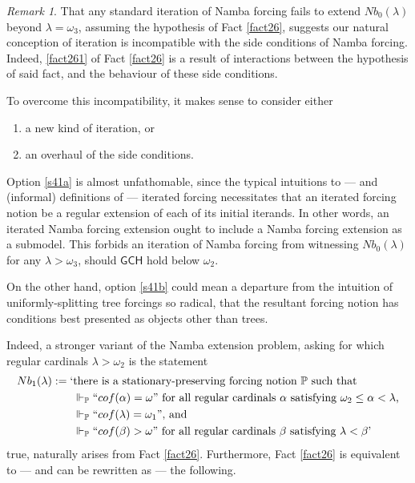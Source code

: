 \documentclass[12pt, twoside]{memoir}
\numberwithin{equation}{section}
\theoremstyle{definition}
\theoremstyle{remark}
\newtheorem{rem}[thm]{Remark}
\theoremstyle{definition}
\theoremstyle{definition}
\theoremstyle{definition}
\theoremstyle{remark}
\begin{document}
\begin{rem}\label{rem47}
That any standard iteration of Namba forcing fails to extend $Nb_0(\lambda)$ beyond $\lambda = \omega_3$, assuming the hypothesis of Fact \ref{fact26}, suggests our natural conception of iteration is incompatible with the side conditions of Namba forcing. Indeed, \ref{fact261} of Fact \ref{fact26} is a result of interactions between the hypothesis of said fact, and the behaviour of these side conditions. 

To overcome this incompatibility, it makes sense to consider either
\begin{enumerate}[label=(\alph*)]
    \item\label{s41a} a new kind of iteration, or 
    \item\label{s41b} an overhaul of the side conditions.
\end{enumerate} 

Option \ref{s41a} is almost unfathomable, since the typical intuitions to --- and (informal) definitions of --- iterated forcing necessitates that an iterated forcing notion be a regular extension of each of its initial iterands. In other words, an iterated Namba forcing extension ought to include a Namba forcing extension as a submodel. This forbids an iteration of Namba forcing from witnessing $Nb_0(\lambda)$ for any $\lambda > \omega_3$, should $\mathsf{GCH}$ hold below $\omega_2$. 

On the other hand, option \ref{s41b} could mean a departure from the intuition of uniformly-splitting tree forcings so radical, that the resultant forcing notion has conditions best presented as objects other than trees.
\end{rem}

Indeed, a stronger variant of the Namba extension problem, asking for which regular cardinals $\lambda > \omega_2$ is the statement
\begin{align*}
    Nb_1(\lambda) := \text{`} & \text{there is a stationary-preserving forcing notion } \mathbb{P} \text{ such that} \\ 
    & \Vdash_{\mathbb{P}} ``cof(\alpha) = \omega" \text{ for all regular cardinals } \alpha \text{ satisfying } \omega_2 \leq \alpha < \lambda \text{,} \\
    & \Vdash_{\mathbb{P}} ``cof(\lambda) = \omega_1" \text{, and} \\
    & \Vdash_{\mathbb{P}} ``cof(\beta) > \omega" \text{ for all regular cardinals } \beta \text{ satisfying } \lambda < \beta \text{'}
\end{align*}
true, naturally arises from Fact \ref{fact26}. Furthermore, Fact \ref{fact26} is equivalent to --- and can be rewritten as --- the following.
\end{document}
